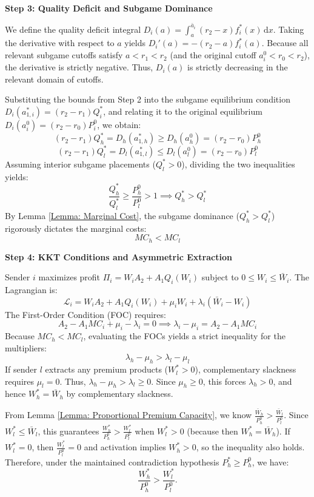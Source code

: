 \documentclass[12pt, a4paper]{article}
\begin{document}
\textbf{Step 3: Quality Deficit and Subgame Dominance}

We define the quality deficit integral $D_i(a) = \int_a^{\bar{a}_i} (r_2 - x) f_i^*(x) \, \mathrm{d}x$. Taking the derivative with respect to $a$ yields $D_i'(a) = -(r_2 - a) f_i^*(a)$. Because all relevant subgame cutoffs satisfy $a < r_1 < r_2$ (and the original cutoff $a_i^0 < r_0 < r_2$), the derivative is strictly negative. Thus, $D_i(a)$ is strictly decreasing in the relevant domain of cutoffs. 

Substituting the bounds from Step 2 into the subgame equilibrium condition $D_i(a_{1,i}^*) = (r_2 - r_1)Q_i^*$, and relating it to the original equilibrium $D_i(a_i^0) = (r_2 - r_0)P_i^0$, we obtain:
\[
    (r_2 - r_1)Q_h^* = D_h(a_{1,h}^*) \ge D_h(a_h^0) = (r_2 - r_0)P_h^0
\]
\[
    (r_2 - r_1)Q_l^* = D_l(a_{1,l}^*) \le D_l(a_l^0) = (r_2 - r_0)P_l^0
\]
Assuming interior subgame placements ($Q_l^* > 0$), dividing the two inequalities yields:
\[
    \frac{Q_h^*}{Q_l^*} \ge \frac{P_h^0}{P_l^0} > 1 \implies Q_h^* > Q_l^*
\]
By Lemma \ref{Lemma: Marginal Cost}, the subgame dominance ($Q_h^* > Q_l^*$) rigorously dictates the marginal costs:
\[
    MC_h < MC_l
\]

\textbf{Step 4: KKT Conditions and Asymmetric Extraction}

Sender $i$ maximizes profit $\Pi_i = W_i A_2 + A_1 Q_i(W_i)$ subject to $0 \le W_i \le \bar{W}_i$. The Lagrangian is:
\[
    \mathcal{L}_i = W_i A_2 + A_1 Q_i(W_i) + \mu_i W_i + \lambda_i (\bar{W}_i - W_i)
\]
The First-Order Condition (FOC) requires:
\[
    A_2 - A_1 MC_i + \mu_i - \lambda_i = 0 \implies \lambda_i - \mu_i = A_2 - A_1 MC_i
\]
Because $MC_h < MC_l$, evaluating the FOCs yields a strict inequality for the multipliers:
\[
    \lambda_h - \mu_h > \lambda_l - \mu_l
\]
If sender $l$ extracts any premium products ($W_l^* > 0$), complementary slackness requires $\mu_l = 0$. Thus, $\lambda_h - \mu_h > \lambda_l \ge 0$. Since $\mu_h \ge 0$, this forces $\lambda_h > 0$, and hence $W_h^* = \bar{W}_h$ by complementary slackness.

From Lemma \ref{Lemma: Proportional Premium Capacity}, we know $\frac{\bar{W}_h}{P_h^0} > \frac{\bar{W}_l}{P_l^0}$. Since $W_l^* \le \bar{W}_l$, this guarantees $\frac{W_h^*}{P_h^0} > \frac{W_l^*}{P_l^0}$ when $W_l^*>0$ (because then $W_h^*=\bar W_h$). If $W_l^* = 0$, then $\frac{W_l^*}{P_l^0}=0$ and activation implies $W_h^*>0$, so the inequality also holds. Therefore, under the maintained contradiction hypothesis $P_h^* \ge P_h^0$, we have:
\[
    \frac{W_h^*}{P_h^0} > \frac{W_l^*}{P_l^0}.
\]
\end{document}
